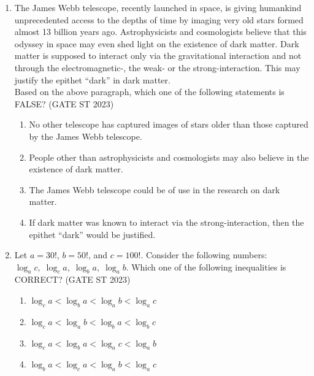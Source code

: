 \documentclass[journal]{IEEEtran}
\begin{document}
\begin{enumerate}[label=\textbf{Q.\arabic*.}, start=1, align=left, itemsep=2em]
\begin{enumerate}[label=\textbf{Q.\arabic*.}, start=6, align=left, itemsep=2em]
\item The James Webb telescope, recently launched in space, is giving humankind unprecedented access to the depths of time by imaging very old stars formed almost 13 billion years ago. Astrophysicists and cosmologists believe that this odyssey in space may even shed light on the existence of dark matter. Dark matter is supposed to interact only via the gravitational interaction and not through the electromagnetic-, the weak- or the strong-interaction. This may justify the epithet ``dark'' in dark matter.\\

Based on the above paragraph, which one of the following statements is FALSE? \hfill(GATE ST 2023)

\begin{enumerate}[label=(\Alph*)]
    \item No other telescope has captured images of stars older than those captured by the James Webb telescope.
    \item People other than astrophysicists and cosmologists may also believe in the existence of dark matter.
    \item The James Webb telescope could be of use in the research on dark matter.
    \item If dark matter was known to interact via the strong-interaction, then the epithet ``dark'' would be justified.
\end{enumerate}

\item Let $a = 30!$, $b = 50!$, and $c = 100!$. Consider the following numbers:
$\log_a c,\; \log_c a,\; \log_b a,\; \log_a b$.\newline
Which one of the following inequalities is CORRECT? \hfill(GATE ST 2023)

\begin{enumerate}[label=(\Alph*)]
    \item $\log_c a < \log_b a < \log_a b < \log_a c$
    \item $\log_c a < \log_a b < \log_b a < \log_b c$
    \item $\log_c a < \log_b a < \log_a c < \log_a b$
    \item $\log_b a < \log_c a < \log_a b < \log_a c$
\end{enumerate}


\end{enumerate}
\end{enumerate}
\end{document}
